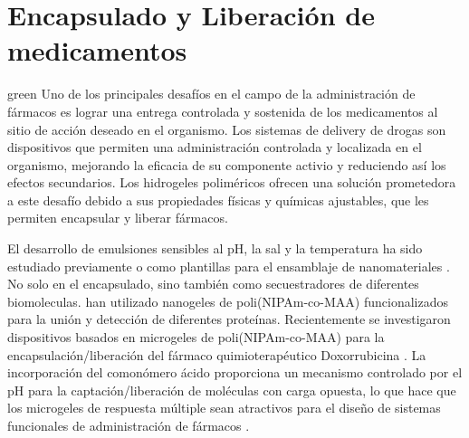 \section{Encapsulado y Liberaci\'on de medicamentos}

\begin{color}{green}
Uno de los principales desaf\'ios en el campo de la administraci\'on de f\'armacos es lograr una entrega controlada y sostenida de los medicamentos al sitio de acci\'on deseado en el organismo. 
Los sistemas de delivery de drogas son dispositivos que permiten una administraci\'on controlada y  localizada en el organismo, mejorando la eficacia de su componente activio y reduciendo as\'i los efectos secundarios. 
Los hidrogeles polim\'ericos ofrecen una soluci\'on prometedora a este desaf\'io debido a sus propiedades f\'isicas y qu\'imicas ajustables, que les permiten encapsular y liberar f\'armacos.


	
	El desarrollo de emulsiones sensibles al pH, la sal y la temperatura ha sido estudiado previamente  \cite{Ngai2005,Ngai2006, Brugger2008, Schmidt2011} o como plantillas para el ensamblaje de nanomateriales \cite{Wong2009}.
	No solo en el encapsulado, sino también como secuestradores de diferentes biomoleculas.
	\citet{Culver2017A}han utilizado nanogeles de poli(NIPAm-co-MAA) funcionalizados para la uni\'on y detecci\'on de diferentes prote\'inas.
	Recientemente se investigaron dispositivos basados en microgeles de poli(NIPAm-co-MAA) para la encapsulación/liberaci\'on del f\'armaco quimioterap\'eutico Doxorrubicina \cite{Giussi2020, MartinezMoro2020, Pergushov2020}.
	La incorporaci\'on del comon\'omero \'acido proporciona un mecanismo controlado por el pH para la captaci\'on/liberaci\'on de mol\'eculas con carga opuesta, lo que hace que los microgeles de respuesta m\'ultiple sean atractivos para el dise\~no de sistemas funcionales de administraci\'on de f\'armacos \cite{Liu2017}.
\end{color}










